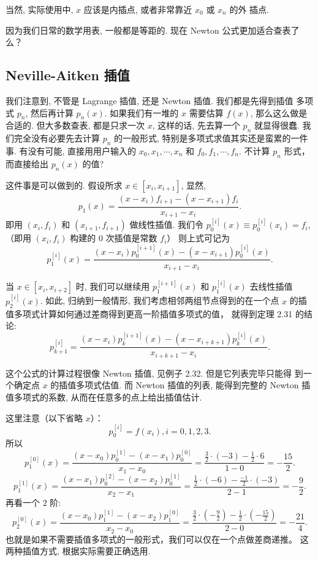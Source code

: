 \documentclass[a4paper]{ctexart}
\begin{document}
当然, 实际使用中, $x$ 应该是内插点, 或者非常靠近 $x_0$ 或 $x_n$ 的外
插点.

因为我们日常的数学用表, 一般都是等距的. 现在 Newton 公式更加适合查表了么？

\subsection{Neville-Aitken 插值}

我们注意到, 不管是 Lagrange 插值, 还是 Newton 插值. 我们都是先得到插值
多项式 $p_n$, 然后再计算 $p_n(x)$. 如果我们有一堆的 $x$ 需要估算
$f(x)$, 那么这么做是合适的. 但大多数查表, 都是只求一次 $x$, 这样的话,
先去算一个 $p_n$ 就显得很蠢. 我们完全没有必要先去计算 $p_n$ 的一般形式,
特别是多项式求值其实还是蛮累的一件事. 有没有可能, 
直接用用户输入的 $x_0, x_1, \cdots, x_n$ 和 $f_0, f_1,
\cdots, f_n$. 不计算 $p_n$ 形式，而直接给出 $p_n(x)$ 的值?

这件事是可以做到的. 假设所求 $x \in [x_i, x_{i + 1}]$, 显然,
$$
p_1(x) = \frac{(x - x_i)f_{i + 1} - (x - x_{i + 1})f_i}{x_{i + 1} - x_i}.
$$
即用 $(x_i, f_i)$ 和 $(x_{i + 1}, f_{i + 1})$ 做线性插值. 
我们令 $p_0^{[i]}(x) \equiv p_0^{[i]}(x_i) = f_i$, （即用 $(x_i, f_i)$ 构建的 
$0$ 次插值是常数 $f_i$）
则上式可记为
$$
p_1^{[i]}(x) = \frac{(x - x_i)p_0^{[i + 1]}(x) - (x - x_{i + 1})p_0^{[i]}(x)}{x_{i + 1} - x_i}.
$$

当 $x \in [x_i, x_{i + 2}]$ 时, 我们可以继续用 $p_1^{[i + 1]}(x)$ 和
$p_1^{[i]}(x)$ 去线性插值 $p_2^{[i]}(x)$. 如此, 归纳到一般情形, 
我们考虑相邻两组节点得到的在一个点 $x$ 的插值多项式计算如何通过差商得到更高一阶插值多项式的值，
就得到定理 2.31 的结论:
$$
p_{k + 1}^{[i]} = \frac{(x - x_i)p_k^{[i + 1]}(x) - (x - x_{i + k + 1})p_k^{[i]}(x)}{x_{i + k + 1} - x_i}.
$$

这个公式的计算过程很像 Newton 插值, 见例子 2.32. 但是它列表完毕只能得
到一个确定点 $x$ 的插值多项式估值. 而 Newton 插值的列表, 能得到完整的
Newton 插值多项式的系数, 从而在任意多的点上给出插值估计.

这里注意（以下省略 $x$）：
\[
p_0^{[i]} = f(x_i), i = 0, 1, 2, 3.
\]
所以
\[
p_1^{[0]}(x) = \frac{(x - x_0)p_0^{[1]} - (x - x_1)p_0^{[0]}}{x_1 - x_0}
= \frac{\frac{3}{2} \cdot (-3) - \frac{1}{2} \cdot 6}{1 - 0} = -\frac{15}{2}.
\]
\[
p_1^{[1]}(x) = \frac{(x - x_1)p_0^{[2]} - (x - x_2)p_0^{[1]}}{x_2 - x_1}
= \frac{\frac{1}{2} \cdot (-6) - \frac{-1}{2} \cdot (-3)}{2 - 1} = -\frac{9}{2}.
\]
再看一个 $2$ 阶:
\[
p_2^{[0]}(x) = \frac{(x - x_0)p_1^{[1]} - (x - x_2)p_1^{[0]}}{x_2 - x_0}
= \frac{\frac{3}{2} \cdot (-\frac{9}{2}) - \frac{1}{2} \cdot (-\frac{15}{2})}{2 - 0} 
= -\frac{21}{4}.
\]
也就是如果不需要插值多项式的一般形式，我们可以仅在一个点做差商递推。
这两种插值方式, 根据实际需要正确选用. 
\end{document}

